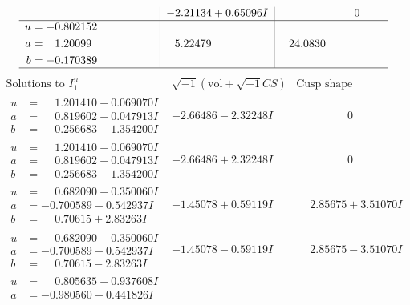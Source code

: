 \documentclass[1p]{elsarticle_modified}
\theoremstyle{definition}
\newcommand{\I}{\sqrt{-1}}
\begin{document}
$$\begin{array}{c|c|c}
 & -2.21134 + 0.65096 I & \phantom{-0.000000 } 0 \\ \hline\begin{aligned}
u &= -0.802152\phantom{ +0.000000I} \\
a &= \phantom{-}1.20099\phantom{ +0.000000I} \\
b &= -0.170389\phantom{ +0.000000I}\end{aligned}
 & \phantom{-}5.22479\phantom{ +0.000000I} & \phantom{-}24.0830\phantom{ +0.000000I}\\
 \hline 
 \end{array}$$\newpage$$\begin{array}{c|c|c}  
\text{Solutions to }I^u_{1}& \I (\text{vol} + \sqrt{-1}CS) & \text{Cusp shape}\\
 \hline 
\begin{aligned}
u &= \phantom{-}1.201410 + 0.069070 I \\
a &= \phantom{-}0.819602 - 0.047913 I \\
b &= \phantom{-}0.256683 + 1.354200 I\end{aligned}
 & -2.66486 - 2.32248 I & \phantom{-0.000000 } 0 \\ \hline\begin{aligned}
u &= \phantom{-}1.201410 - 0.069070 I \\
a &= \phantom{-}0.819602 + 0.047913 I \\
b &= \phantom{-}0.256683 - 1.354200 I\end{aligned}
 & -2.66486 + 2.32248 I & \phantom{-0.000000 } 0 \\ \hline\begin{aligned}
u &= \phantom{-}0.682090 + 0.350060 I \\
a &= -0.700589 + 0.542937 I \\
b &= \phantom{-}0.70615 + 2.83263 I\end{aligned}
 & -1.45078 + 0.59119 I & \phantom{-}2.85675 + 3.51070 I \\ \hline\begin{aligned}
u &= \phantom{-}0.682090 - 0.350060 I \\
a &= -0.700589 - 0.542937 I \\
b &= \phantom{-}0.70615 - 2.83263 I\end{aligned}
 & -1.45078 - 0.59119 I & \phantom{-}2.85675 - 3.51070 I \\ \hline\begin{aligned}
u &= \phantom{-}0.805635 + 0.937608 I \\
a &= -0.980560 - 0.441826 I \\

\end{aligned}
\end{array}$$
\end{document}
